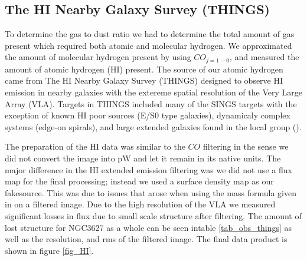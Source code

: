 \subsection{The HI Nearby Galaxy Survey (THINGS)}

To determine the gas to dust ratio we had to determine the total amount of gas present which required both atomic and molecular hydrogen.  We approximated the amount of molecular hydrogen present by using $CO_{j=1-0}$, and measured the amount of atomic hydrogen (HI) present.  The source of our atomic hydrogen came from The HI Nearby Galaxy Survey (THINGS) designed to observe HI emission in nearby galaxies with the extereme spatial resolution of the Very Large Array (VLA).  Targets in THINGS included many of the SINGS targets with the exception of known HI poor sources (E/S0 type galaxies), dynamicaly complex systems (edge-on spirals), and large extended galaxies found in the local group (\citep{walter2008}).

The preparation of the HI data was similar to the $CO$ filtering in the sense we did not convert the image into pW and let it remain in its native units.  The major difference in the HI extended emission filtering was we did not use a flux map for the final processing; instead we used a surface density map as our fakesource.  This was due to issues that arose when using the mass formula given in \citep{walter2008} on a filtered image.  Due to the high resolution of the VLA we measured significant losses in flux due to small scale structure after filtering.  The amount of lost structure for NGC3627 as a whole can be seen intable \ref{tab_obs_things} as well as the resolution, and rms of the filtered image.  The final data product is shown in figure \ref{fig_HI}.

